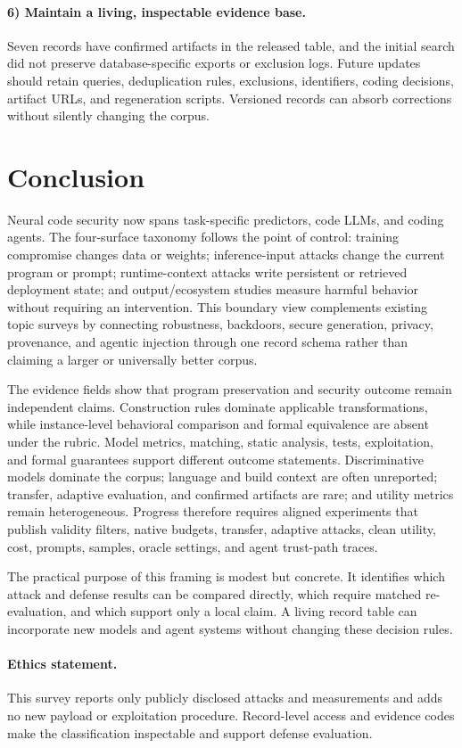 \documentclass[acmsmall,screen,review]{acmart}
\begin{document}
\paragraph{6) Maintain a living, inspectable evidence base.} Seven records have confirmed artifacts in the released table, and the initial search did not preserve database-specific exports or exclusion logs. Future updates should retain queries, deduplication rules, exclusions, identifiers, coding decisions, artifact URLs, and regeneration scripts. Versioned records can absorb corrections without silently changing the corpus.

\section{Conclusion} \label{sec:conclusion}

Neural code security now spans task-specific predictors, code LLMs, and coding agents. The four-surface taxonomy follows the point of control: training compromise changes data or weights; inference-input attacks change the current program or prompt; runtime-context attacks write persistent or retrieved deployment state; and output/ecosystem studies measure harmful behavior without requiring an intervention. This boundary view complements existing topic surveys by connecting robustness, backdoors, secure generation, privacy, provenance, and agentic injection through one record schema rather than claiming a larger or universally better corpus.

The evidence fields show that program preservation and security outcome remain independent claims. Construction rules dominate applicable transformations, while instance-level behavioral comparison and formal equivalence are absent under the rubric. Model metrics, matching, static analysis, tests, exploitation, and formal guarantees support different outcome statements. Discriminative models dominate the corpus; language and build context are often unreported; transfer, adaptive evaluation, and confirmed artifacts are rare; and utility metrics remain heterogeneous. Progress therefore requires aligned experiments that publish validity filters, native budgets, transfer, adaptive attacks, clean utility, cost, prompts, samples, oracle settings, and agent trust-path traces.

The practical purpose of this framing is modest but concrete. It identifies which attack and defense results can be compared directly, which require matched re-evaluation, and which support only a local claim. A living record table can incorporate new models and agent systems without changing these decision rules.

\paragraph*{Ethics statement.} This survey reports only publicly disclosed attacks and measurements and adds no new payload or exploitation procedure. Record-level access and evidence codes make the classification inspectable and support defense evaluation.



\end{document}
